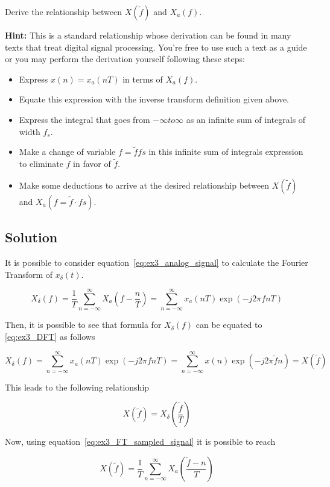 Derive the relationship between $X(\tilde{f})$ and $X_a (f)$.

\textbf{Hint:} This is a standard relationship whose derivation can be found in
many texts that treat digital signal processing. You’re free to use such a text
as a guide or you may perform the derivation yourself following these steps:

\begin{itemize}
	\item Express $x(n) = x_a (nT)$ in terms of $X_a (f)$.
	\item Equate this expression with the inverse transform definition given above.
	\item Express the integral that goes from $−\infty to \infty$ as an infinite
	      sum of integrals of width $f_s$.
	\item Make a change of variable $f = \tilde{f}  fs$ in this infinite sum of
	      integrals expression to eliminate $f$ in favor of $\tilde{f}$.
	\item Make some deductions to arrive at the desired relationship between
	      $X(\tilde{f})$ and $X_a (f = \tilde{f}·fs )$.
\end{itemize}

\subsection{Solution}

It is possible to consider equation~\ref{eq:ex3_analog_signal} to calculate the
Fourier Transform of $x_\delta(t)$.

\begin{equation}
	X_\delta (f) = \frac{1}{T} \sum_{n=-\infty}^{\infty} X_a(f- \frac{n}{T})
	= \sum_{n=-\infty}^{\infty} x_a(nT) \exp{(-j 2 \pi f n T)}
\end{equation}

Then, it is possible to see that formula for $X_\delta (f)$ can be equated to
\ref{eq:ex3_DFT} as follows

\begin{equation}
	X_\delta (f) = \sum_{n=-\infty}^{\infty} x_a(nT) \exp{(-j 2 \pi f n T)}
	= \sum_{n=-\infty}^{\infty} x(n) \exp{(-j 2 \pi \tilde{f} n)}
	= X(\tilde{f})
\end{equation}

This leads to the following relationship

\begin{equation}
	X(\tilde{f}) = X_\delta (\frac{\tilde{f}}{T})
\end{equation}

Now, using equation~\ref{eq:ex3_FT_sampled_signal} it is possible to reach

\begin{equation}
	X(\tilde{f}) = \frac{1}{T} \sum_{n=-\infty}^{\infty} X_a(\frac{\tilde{f}- n}{T})
\end{equation}
